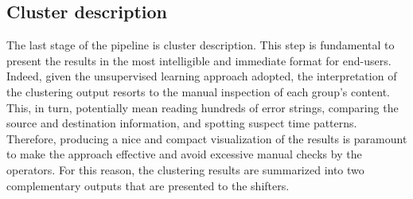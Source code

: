 \subsection{Cluster description}\label{sec:viz}




The last stage of the pipeline is cluster description. 
This step is fundamental to present the results in the most intelligible and immediate format for end-users.
Indeed, given the unsupervised learning approach adopted, the interpretation of the clustering output resorts to the manual inspection of each group's content.
This, in turn, potentially mean reading hundreds of error strings, comparing the source and destination information, and spotting suspect time patterns.  
Therefore, producing a nice and compact visualization of the results is paramount to make the approach effective and avoid excessive manual checks by the operators.
For this reason, the clustering results are summarized into two complementary outputs that are presented to the shifters.


